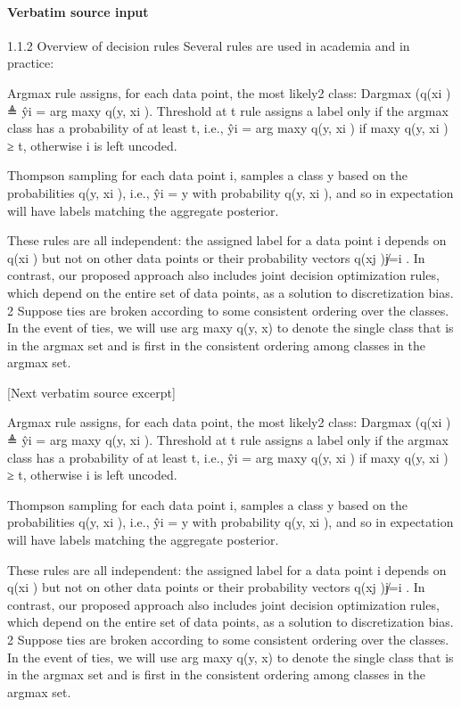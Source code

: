 \documentclass[10pt]{article}
\begin{document}
\paragraph{Verbatim source input}
\begin{ReviewVerbatim}
1.1.2    Overview of decision rules
Several rules are used in academia and in practice:

Argmax rule assigns, for each data point, the most likely2 class: Dargmax ({q(xi }) ≜ {ŷi = arg maxy q(y, xi )}.
Threshold at t rule assigns a label only if the argmax class has a probability of at least t, i.e., ŷi =
    arg maxy q(y, xi ) if maxy q(y, xi ) ≥ t, otherwise i is left uncoded.

Thompson sampling for each data point i, samples a class y based on the probabilities q(y, xi ), i.e., ŷi = y
    with probability q(y, xi ), and so in expectation will have labels matching the aggregate posterior.

    These rules are all independent: the assigned label for a data point i depends on q(xi ) but not on other
data points or their probability vectors {q(xj )}j̸=i .
    In contrast, our proposed approach also includes joint decision optimization rules, which depend on the
entire set of data points, as a solution to discretization bias.
   2 Suppose ties are broken according to some consistent ordering over the classes.      In the event of ties, we will use
arg maxy q(y, x) to denote the single class that is in the argmax set and is first in the consistent ordering among classes
in the argmax set.

[Next verbatim source excerpt]

Argmax rule assigns, for each data point, the most likely2 class: Dargmax ({q(xi }) ≜ {ŷi = arg maxy q(y, xi )}.
Threshold at t rule assigns a label only if the argmax class has a probability of at least t, i.e., ŷi =
    arg maxy q(y, xi ) if maxy q(y, xi ) ≥ t, otherwise i is left uncoded.

Thompson sampling for each data point i, samples a class y based on the probabilities q(y, xi ), i.e., ŷi = y
    with probability q(y, xi ), and so in expectation will have labels matching the aggregate posterior.

    These rules are all independent: the assigned label for a data point i depends on q(xi ) but not on other
data points or their probability vectors {q(xj )}j̸=i .
    In contrast, our proposed approach also includes joint decision optimization rules, which depend on the
entire set of data points, as a solution to discretization bias.
   2 Suppose ties are broken according to some consistent ordering over the classes.      In the event of ties, we will use
arg maxy q(y, x) to denote the single class that is in the argmax set and is first in the consistent ordering among classes
in the argmax set.
\end{ReviewVerbatim}
\end{document}

